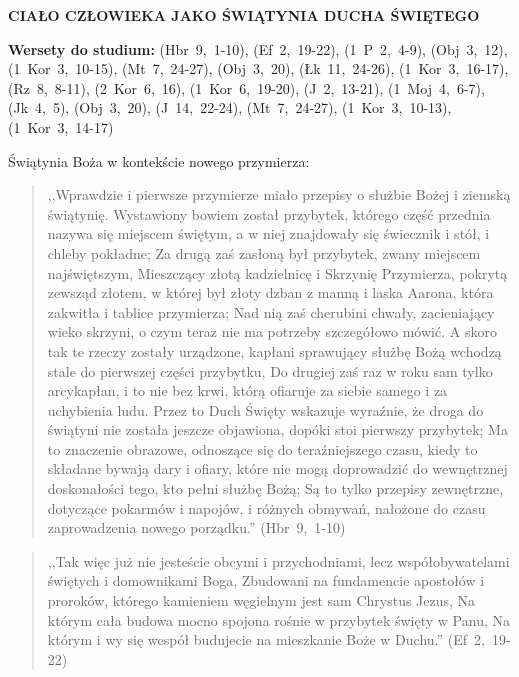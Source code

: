 \documentclass[10pt,a4paper,oneside]{article}
\begin{document}
\centerline{\textbf{\MakeUppercase{Ciało człowieka jako Świątynia Ducha Świętego}}}
\begin{center}
\textbf{Wersety do studium:} \mbox{(Hbr 9, 1-10)}, \mbox{(Ef 2, 19-22)}, \mbox{(1 P 2, 4-9)}, \mbox{(Obj 3, 12)}, \mbox{(1 Kor 3, 10-15)}, \mbox{(Mt 7, 24-27)}, \mbox{(Obj 3, 20)}, \mbox{(Łk 11, 24-26)}, \mbox{(1 Kor 3, 16-17)}, \mbox{(Rz 8, 8-11)}, \mbox{(2 Kor 6, 16)}, \mbox{(1 Kor 6, 19-20)}, \mbox{(J 2, 13-21)}, \mbox{(1 Moj 4, 6-7)}, \mbox{(Jk 4, 5)}, \mbox{(Obj 3, 20)}, \mbox{(J 14, 22-24)}, \mbox{(Mt 7, 24-27)}, \mbox{(1 Kor 3, 10-13)}, \mbox{(1 Kor 3, 14-17)}
\end{center}
Świątynia Boża w kontekście nowego przymierza:
\begin{quote}
,,Wprawdzie i pierwsze przymierze miało przepisy o służbie Bożej i ziemską świątynię. Wystawiony bowiem został przybytek, którego część przednia nazywa się miejscem świętym, a w niej znajdowały się świecznik i stół, i chleby pokładne; Za drugą zaś zasłoną był przybytek, zwany miejscem najświętszym, Mieszczący złotą kadzielnicę i Skrzynię Przymierza, pokrytą zewsząd złotem, w której był złoty dzban z manną i laska Aarona, która zakwitła i tablice przymierza; Nad nią zaś cherubini chwały, zacieniający wieko skrzyni, o czym teraz nie ma potrzeby szczegółowo mówić. A skoro tak te rzeczy zostały urządzone, kapłani sprawujący służbę Bożą wchodzą stale do pierwszej części przybytku, Do drugiej zaś raz w roku sam tylko arcykapłan, i to nie bez krwi, którą ofiaruje za siebie samego i za uchybienia ludu. Przez to Duch Święty wskazuje wyraźnie, że droga do świątyni nie została jeszcze objawiona, dopóki stoi pierwszy przybytek; Ma to znaczenie obrazowe, odnoszące się do teraźniejszego czasu, kiedy to składane bywają dary i ofiary, które nie mogą doprowadzić do wewnętrznej doskonałości tego, kto pełni służbę Bożą; Są to tylko przepisy zewnętrzne, dotyczące pokarmów i napojów, i różnych obmywań, nałożone do czasu zaprowadzenia nowego porządku.'' \mbox{(Hbr 9, 1-10)}
\end{quote}
\begin{quote}
,,Tak więc już nie jesteście obcymi i przychodniami, lecz współobywatelami świętych i domownikami Boga, Zbudowani na fundamencie apostołów i proroków, którego kamieniem węgielnym jest sam Chrystus Jezus, Na którym cała budowa mocno spojona rośnie w przybytek święty w Panu, Na którym i wy się wespół budujecie na mieszkanie Boże w Duchu.'' \mbox{(Ef 2, 19-22)}
\end{quote}
\end{document}

